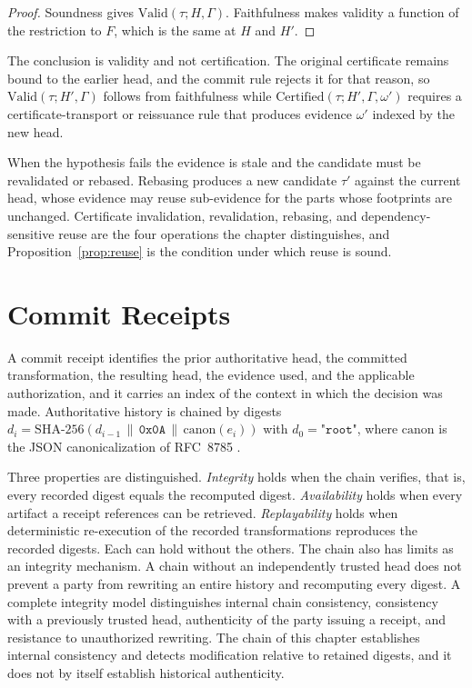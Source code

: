 \documentclass[12pt,oneside,openany]{book}
\theoremstyle{spherepop}
\theoremstyle{remarkstyle}
\begin{document}
\begin{proof}
Soundness gives $\mathrm{Valid}(\tau;H,\Gamma)$. Faithfulness makes validity a function of the restriction to $F$, which is the same at $H$ and $H'$.
\end{proof}

The conclusion is validity and not certification. The original certificate remains bound to the earlier head, and the commit rule rejects it for that reason, so $\mathrm{Valid}(\tau;H',\Gamma)$ follows from faithfulness while $\mathrm{Certified}(\tau;H',\Gamma,\omega')$ requires a certificate-transport or reissuance rule that produces evidence $\omega'$ indexed by the new head.

When the hypothesis fails the evidence is stale and the candidate must be revalidated or rebased. Rebasing produces a new candidate $\tau'$ against the current head, whose evidence may reuse sub-evidence for the parts whose footprints are unchanged. Certificate invalidation, revalidation, rebasing, and dependency-sensitive reuse are the four operations the chapter distinguishes, and Proposition~\ref{prop:reuse} is the condition under which reuse is sound.

\section{Commit Receipts}

A commit receipt identifies the prior authoritative head, the committed transformation, the resulting head, the evidence used, and the applicable authorization, and it carries an index of the context in which the decision was made. Authoritative history is chained by digests $d_i=\mathrm{SHA\text{-}256}(d_{i-1}\,\|\,\texttt{0x0A}\,\|\,\mathrm{canon}(e_i))$ with $d_0=\texttt{"root"}$, where $\mathrm{canon}$ is the JSON canonicalization of RFC~8785 \cite{rfc8785}.

Three properties are distinguished. \emph{Integrity} holds when the chain verifies, that is, every recorded digest equals the recomputed digest. \emph{Availability} holds when every artifact a receipt references can be retrieved. \emph{Replayability} holds when deterministic re-execution of the recorded transformations reproduces the recorded digests. Each can hold without the others. The chain also has limits as an integrity mechanism. A chain without an independently trusted head does not prevent a party from rewriting an entire history and recomputing every digest. A complete integrity model distinguishes internal chain consistency, consistency with a previously trusted head, authenticity of the party issuing a receipt, and resistance to unauthorized rewriting. The chain of this chapter establishes internal consistency and detects modification relative to retained digests, and it does not by itself establish historical authenticity.
\end{document}
